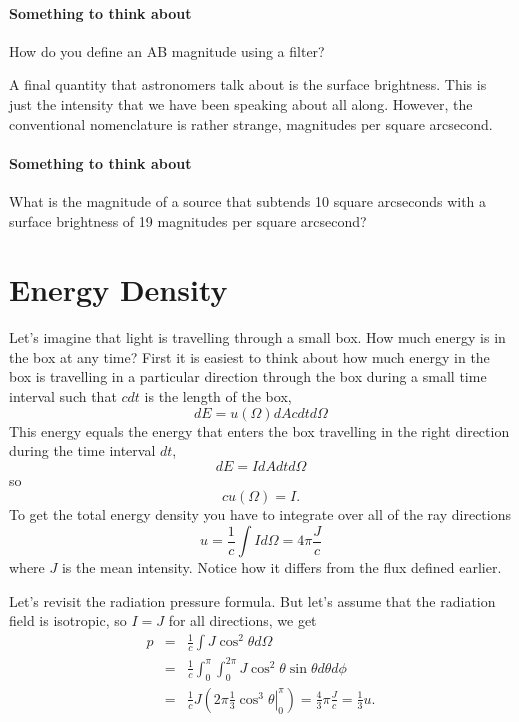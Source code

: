 \paragraph{Something to think about}
How do you define an AB magnitude using a filter?

A final quantity that astronomers talk about is the surface
brightness.  This is just the intensity that we have been speaking
about all along.  However, the conventional nomenclature is rather strange,
magnitudes per square arcsecond.

\paragraph{Something to think about}
What is the magnitude of a source that subtends 10 square arcseconds
with a surface brightness of 19 magnitudes per square arcsecond?

\section{Energy Density}
\label{sec:energy-density}
Let's imagine that light is travelling through a small box.  How much
energy is in the box at any time?  First it is easiest to think about
how much energy in the box is travelling in a particular direction
through the box during a small time interval such that $c dt$ is the
length of the box,
\begin{equation}
d E = u(\Omega) d\!A c d t d\Omega
\label{eq:13}
\end{equation}
This energy equals the energy that enters the box travelling in the 
right direction during the time interval $dt$,
\begin{equation}
d E = I d\!A d t d\Omega
\label{eq:14}
\end{equation}
so
\begin{equation}
c u(\Omega) = I.
\label{eq:15}
\end{equation}
To get the total energy density you have to integrate over all of the 
ray directions
\begin{equation}
u = \frac{1}{c} \int I d \Omega = 4\pi \frac{J}{c}
\label{eq:16}
\end{equation}
where $J$ is the mean intensity.   Notice how it differs from the flux
defined earlier.

Let's revisit the radiation pressure formula.   But let's assume that
the radiation field is isotropic, so $I=J$ for all directions, we get
\begin{eqnarray}
\label{eq:17}
p &=& \frac{1}{c} \int J \cos^2\theta d \Omega \\
\label{eq:18}
  &=& \frac{1}{c} \int_0^\pi \int_0^{2\pi}J \cos^2\theta \sin\theta d\theta d \phi \\
  &=& \frac{1}{c} J \left ( 2 \pi \left . \frac{1}{3} \cos^3\theta \right |_0^\pi
  \right ) = \frac{4}{3} \pi \frac{J}{c} = \frac{1}{3} u.
\label{eq:19}
\end{eqnarray}


